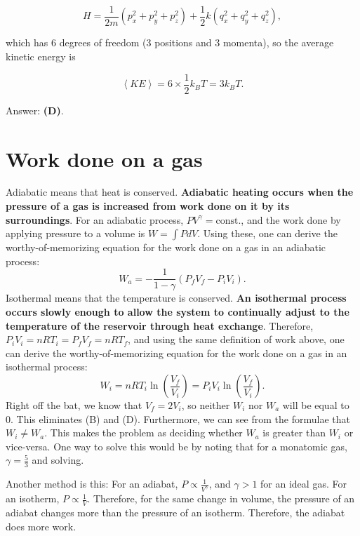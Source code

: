 \documentclass[11pt]{paper}
\newcommand{\answer}[1]{Answer: \textbf{(#1)}.}
\begin{document}
\begin{equation}
H = \frac{1}{2m} \left( p_x^2 + p_y^2 + p_z^2 \right) + \frac{1}{2} k \left( q_x^2 + q_y^2 + q_z^2 \right),
\end{equation}

which has 6 degrees of freedom (3 positions and 3 momenta), so the average kinetic energy is 

\begin{equation}
\left< KE \right>  = 6 \times \frac{1}{2} k_B T = 3 k_B T.
\end{equation}

\answer{D}

\section{Work done on a gas}
Adiabatic means that heat is conserved.  \textbf{Adiabatic heating occurs when the pressure of a gas is increased from work done on it by its surroundings}. For an adiabatic process, $PV^\gamma = \text{const.}$, and the work done by applying pressure to a volume is $W = \int P dV$.  Using these, one can derive the worthy-of-memorizing equation for the work done on a gas in an adiabatic process:
\begin{equation}
W_{a} = -\frac{1}{1-\gamma} \left( P_f V_f - P_i V_i \right).
\end{equation}
Isothermal means that the temperature is conserved.  \textbf{An isothermal process occurs slowly enough to allow the system to continually adjust to the temperature of the reservoir through heat exchange}. Therefore, $P_i V_i = n R T_i = P_f V_f = n R T_f$, and using the same definition of work above, one can derive the worthy-of-memorizing equation for the work done on a gas in an isothermal process:
\begin{equation}
W_{i} = n R T_i \ln \left( \frac{V_f}{V_i}\right) = P_i V_i \ln \left( \frac{V_f}{V_i}\right).
\end{equation}
Right off the bat, we know that $V_f = 2V_i$, so neither $W_i$ nor $W_a$ will be equal to 0.  This eliminates (B) and (D).  Furthermore, we can see from the formulae that $W_i \neq W_a$.  This makes the problem as deciding whether $W_a$ is greater than $W_i$ or vice-versa.  One way to solve this would be by noting that for a monatomic gas, $\gamma = \frac{5}{3}$ and solving.

Another method is this:  For an adiabat, $P \propto \frac{1}{V^\gamma}$, and $\gamma > 1$ for an ideal gas.  For an isotherm, $P \propto \frac{1}{V}$.  Therefore, for the same change in volume, the pressure of an adiabat changes more than the pressure of an isotherm.  Therefore, the adiabat does more work.\\
\end{document}
